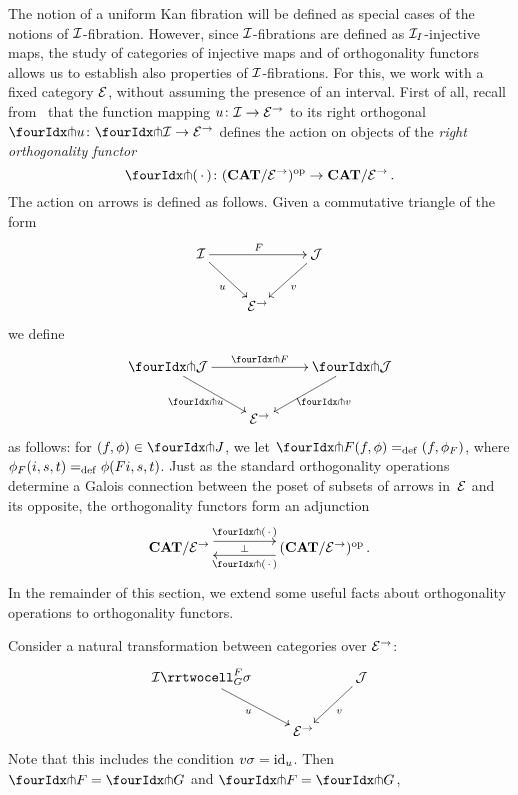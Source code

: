 \documentclass[reqno,10pt,a4paper,oneside]{amsart}
\begin{document}
The notion of a uniform Kan fibration will be defined as special cases of the notions of
$\cal{I}$-fibration. However, since $\cal{I}$-fibrations are defined as $\cal{I}_\interval$-injective 
maps, the study of categories of injective maps and of orthogonality functors allows us to
establish also properties of $\cal{I}$-fibrations.  For this, we work with a fixed category $\catE$, without assuming the presence of an interval. First of all, recall from~\cite{garner:small-object-argument} that the function mapping $u \co \cal{I} \to \catE^\to$ to its right orthogonal $\liftr{u} \co \liftr{\cal{I}} \to \cal{E}^\to$ defines the action on objects of the \emph{right orthogonality functor}
\[
\liftr{\brarghole} \co  (\CAT/\catE^{\to})^{\op} \to \CAT/\catE^{\to} \, .
\]
The action  on arrows is defined as follows. Given a commutative triangle of the form
\[
\xymatrix{
\cal{I} \ar[dr]_u \ar[rr]^F & & \cal{J} \ar[dl]^{v} \\
 & \catE^\to }
 \]
we define 
\[
\xymatrix{
\liftr{\cal{J}} \ar[dr]_{\liftr{u}} \ar[rr]^{\liftr{F}} & & \liftr{\cal{J}} \ar[dl]^{\liftr{v}} \\
 & \catE^\to }
\]
as follows: for $(f, \phi) \in \liftr{J}$, we let $\liftr{F}(f,\phi) \defeq (f, \phi_F)$, where $\phi_F(i, s, t) \defeq \phi(Fi, s, t)$. 
Just as the standard orthogonality operations determine a Galois connection between the poset of subsets of arrows in~$\catE$ and its opposite, the orthogonality functors form an adjunction 
\begin{equation}
\label{garner-adjunction}
\begin{gathered}
\xymatrix@C+2em{
  \CAT/\catE^{\to}
  \ar@<5pt>[r]^-{\liftl{\brarghole}}
  \ar@{}[r]|-{\bot}
&
  (\CAT/\catE^{\to})^{\op} \, .
  \ar@<5pt>[l]^-{\liftr{\brarghole}}
}
\end{gathered}
\end{equation}
In the remainder of this section, we extend some useful facts about orthogonality operations to orthogonality functors.






\begin{proposition}
Consider a natural transformation between categories over $\catE^{\to}$:
\[
\xymatrix{
  \cal{I}
  \rrtwocell_G^F{\sigma}
 \ar[dr]_{u}
&&
  \cal{J}
  \ar[dl]^{v}
\\&
  \catE^{\to}
}
\]
Note that this includes the condition $v \sigma = \id_u$.
Then $\liftr{F} = \liftr{G}$ and $\liftl{F} = \liftl{G}$, 
\end{proposition}
\end{document}
